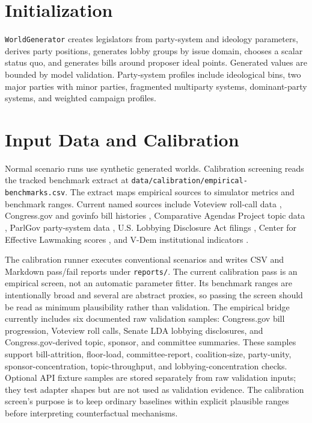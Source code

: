 \documentclass[manuscript,review,anonymous]{acmart}
\begin{document}
\section{Initialization}

\texttt{WorldGenerator} creates legislators from party-system and ideology parameters, derives party positions, generates lobby groups by issue domain, chooses a scalar status quo, and generates bills around proposer ideal points. Generated values are bounded by model validation. Party-system profiles include ideological bins, two major parties with minor parties, fragmented multiparty systems, dominant-party systems, and weighted campaign profiles.

\section{Input Data and Calibration}

Normal scenario runs use synthetic generated worlds. Calibration screening reads the tracked benchmark extract at \texttt{data/calibration/empirical-benchmarks.csv}. The extract maps empirical sources to simulator metrics and benchmark ranges. Current named sources include Voteview roll-call data \citep{Voteview2021}, Congress.gov and govinfo bill histories \citep{CongressGovData,GovinfoBillStatus2020}, Comparative Agendas Project topic data \citep{ComparativeAgendasProject}, ParlGov party-system data \citep{ParlGov2024}, U.S. Lobbying Disclosure Act filings \citep{SenateLDA}, Center for Effective Lawmaking scores \citep{CenterEffectiveLawmaking,VoldenWiseman2014}, and V-Dem institutional indicators \citep{VDemDataset}.

The calibration runner executes conventional scenarios and writes CSV and Markdown pass/fail reports under \texttt{reports/}. The current calibration pass is an empirical screen, not an automatic parameter fitter. Its benchmark ranges are intentionally broad and several are abstract proxies, so passing the screen should be read as minimum plausibility rather than validation. The empirical bridge currently includes six documented raw validation samples: Congress.gov bill progression, Voteview roll calls, Senate LDA lobbying disclosures, and Congress.gov-derived topic, sponsor, and committee summaries. These samples support bill-attrition, floor-load, committee-report, coalition-size, party-unity, sponsor-concentration, topic-throughput, and lobbying-concentration checks. Optional API fixture samples are stored separately from raw validation inputs; they test adapter shapes but are not used as validation evidence. The calibration screen's purpose is to keep ordinary baselines within explicit plausible ranges before interpreting counterfactual mechanisms.
\end{document}
